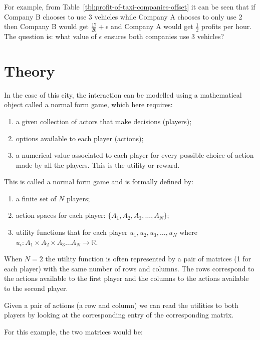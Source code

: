 For example, from Table~\ref{tbl:profit-of-taxi-companies-offset} it can be seen
that if Company B chooses to use 3 vehicles while Company A chooses to only use
2 then Company B would get \(\frac{17}{20} + \epsilon\) and Company A would get
\(\frac{1}{2}\) profits per hour. The question is: what value of \(\epsilon\)
ensures both companies use 3 vehicles?

\section{Theory}\label{sec:game_theory_theory}

In the case of this city, the interaction can be modelled using a mathematical
object called a normal form game, which here requires:

\begin{enumerate}
    \item a given collection of actors that make decisions (players);
    \item options available to each player (actions);
    \item a numerical value associated to each player for every possible
        choice of action made by all the players. This is the utility or reward.
\end{enumerate}

This is called a normal form game and is formally defined by:

\begin{enumerate}
    \item a finite set of \(N\) players;
    \item action spaces for each player: \(\{A_1, A_2, A_3, \dots, A_N\}\);
    \item utility functions that for each player
          \(u_1, u_2, u_3, \dots, u_N\) where
          \(u_i:A_1\times A_2 \times A_3 \dots A_N \to \mathbb{R}\).
\end{enumerate}

When \(N=2\) the utility function is often represented by a pair of
matrices (1 for each player) with the same number of rows and
columns. The rows correspond to the actions available to the first player and
the columns to the actions available to the second player.

Given a pair of actions (a row and column) we can read the utilities to both
players by looking at the corresponding entry of the corresponding matrix.

For this example, the two matrices would be:

